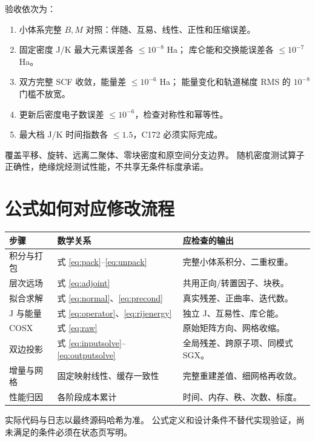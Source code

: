 \documentclass[UTF8,fontset=fandol,11pt,a4paper]{ctexart}
\numberwithin{equation}{section}
\begin{document}
验收依次为：
\begin{enumerate}
\item 小体系完整 \(B,M\) 对照：伴随、互易、线性、正性和压缩误差。
\item 固定密度 J/K 最大元素误差各 \(\leq10^{-8}\) Ha；
库仑能和交换能误差各 \(\leq10^{-7}\) Ha。
\item 双方完整 SCF 收敛，能量差 \(\leq10^{-6}\) Ha；
能量变化和轨道梯度 RMS 的 \(10^{-8}\) 门槛不放宽。
\item 更新后密度电子数误差 \(\leq10^{-6}\)，检查对称性和幂等性。
\item 最大档 J/K 时间指数各 \(\leq1.5\)，C172 必须实际完成。
\end{enumerate}
覆盖平移、旋转、远离二聚体、零块密度和原空间分支边界。
随机密度测试算子正确性，绝缘烷烃测试性能，不共享无条件标度承诺。

\section{公式如何对应修改流程}
\begin{longtable}{p{}p{}p{}}
\toprule 步骤&数学关系&应检查的输出\\\midrule\endhead
积分与打包&式 \eqref{eq:pack}--\eqref{eq:unpack}&完整小体系积分、二重权重。\\
层次远场&式 \eqref{eq:adjoint}&共用正向/转置因子、块秩。\\
拟合求解&式 \eqref{eq:normal}、\eqref{eq:precond}&真实残差、正曲率、迭代数。\\
J 与能量&式 \eqref{eq:operator}、\eqref{eq:rijenergy}&独立 J、互易性、库仑能。\\
COSX&式 \eqref{eq:raw}&原始矩阵方向、网格收缩。\\
双边投影&式 \eqref{eq:inputsolve}--\eqref{eq:outputsolve}&全局残差、跨原子项、同模式 SGX。\\
增量与网格&固定映射线性、缓存一致性&完整重建差值、细网格再收敛。\\
性能归因&各阶段成本累计&时间、内存、秩、次数、标度。\\
\bottomrule
\end{longtable}
实际代码与日志以最终源码哈希为准。
公式定义和设计条件不替代实现验证，尚未满足的条件必须在状态页写明。



\appendix
\end{document}
